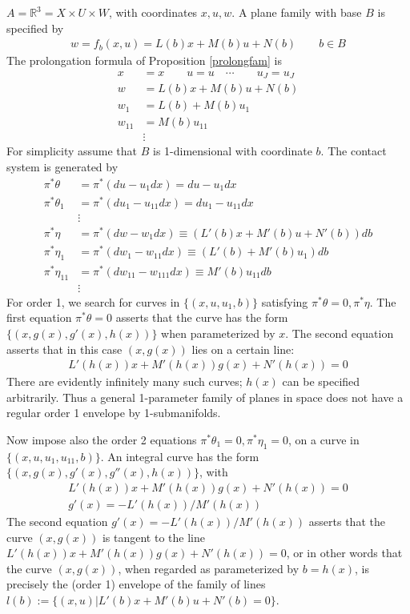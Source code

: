 \documentclass[12pt]{article}
\numberwithin{equation}{section}
\theoremstyle{plain}
\theoremstyle{definition}
\newcommand{\R}{\mathbb{R}}
\begin{document}
$A=\R^{3}=X\times U\times W$, with coordinates $x,u,w$. A plane family with base $B$ is specified by
\begin{align*}
w=f_{b}(x,u)=L(b)x+M(b)u+N(b)\qquad b\in B
\end{align*}
The prolongation formula of Proposition \ref{prolongfam} is
\begin{align*}
x&=x \qquad u=u \quad \cdots \qquad u_{J}=u_{J}\\
w&=L(b)x+M(b)u+N(b)\\
w_{1}&=L(b)+M(b)u_{1}\\
w_{11}&=M(b)u_{11}\\
&\vdots
\end{align*}
For simplicity assume that $B$ is 1-dimensional with coordinate $b$. The contact system is generated by
\begin{align*}
\pi^{*}\theta&=\pi^{*}(du-u_{1}dx)=du-u_{1}dx \\
\pi^{*}\theta_{1}&=\pi^{*}(du_{1}-u_{11}dx)= du_{1}-u_{11}dx\\
&\vdots\\
\pi^{*}\eta&=\pi^{*}(dw-w_{1}dx)\equiv (L'(b)x+M'(b)u+N'(b))db\\
\pi^{*}\eta_{1}&=\pi^{*}(dw_{1}-w_{11}dx)\equiv (L'(b)+M'(b)u_{1})db\\
\pi^{*}\eta_{11}&=\pi^{*}(dw_{11}-w_{111}dx)\equiv M'(b)u_{11}db\\
&\vdots
\end{align*}
For order 1, we search for curves in $\{(x,u,u_{1},b)\}$ satisfying $\pi^{*}\theta=0,\pi^{*}\eta$. The first equation $\pi^{*}\theta=0$ asserts that the curve has the form $\{(x,g(x),g'(x),h(x))\}$ when parameterized by $x$. The second equation asserts that in this case $(x,g(x))$ lies on a certain line:
\begin{align*}
L'(h(x))x+M'(h(x))g(x)+N'(h(x))=0
\end{align*}
There are evidently infinitely many such curves; $h(x)$ can be specified arbitrarily. Thus a general 1-parameter family of planes in space does not have a regular order 1 envelope by 1-submanifolds.

Now impose also the order 2 equations $\pi^{*}\theta_{1}=0,\pi^{*}\eta_{1}=0$, on a curve in $\{(x,u,u_{1},u_{11},b)\}$. An integral curve has the form $\{(x,g(x),g'(x),g''(x),h(x))\}$, with 
\begin{align*}
L'(h(x))x+M'(h(x))g(x)+N'(h(x))=0\\
g'(x)=-L'(h(x))/M'(h(x))
\end{align*}
The second equation $g'(x)=-L'(h(x))/M'(h(x))$ asserts that the curve $(x,g(x))$ is tangent to the line $L'(h(x))x+M'(h(x))g(x)+N'(h(x))=0$, or in other words that the curve $(x,g(x))$, when regarded as parameterized by $b=h(x)$, is precisely the (order 1) envelope of the family of lines $l(b):=\{(x,u)|L'(b)x+M'(b)u+N'(b)=0\}$.
\end{document}
